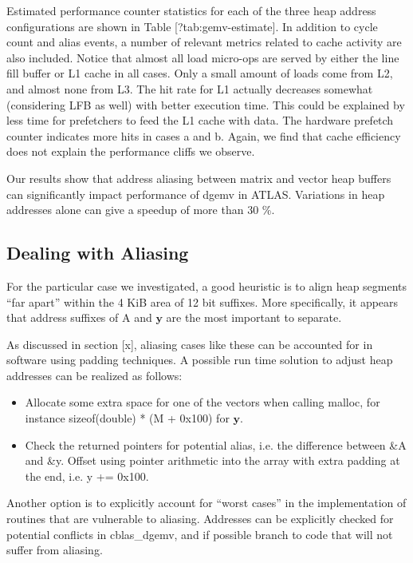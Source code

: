 \documentclass[a4paper,10pt,twocolumn,twoside]{article}
\begin{document}
Estimated performance counter statistics for each of the three heap address configurations are shown in Table [?tab:gemv-estimate].
In addition to cycle count and alias events, a number of relevant metrics related to cache activity are also included.
Notice that almost all load micro-ops are served by either the line fill buffer or L1 cache in all cases.
Only a small amount of loads come from L2, and almost none from L3.
The hit rate for L1 actually decreases somewhat (considering LFB as well) with better execution time.
This could be explained by less time for prefetchers to feed the L1 cache with data.
The hardware prefetch counter indicates more hits in cases a and b.
Again, we find that cache efficiency does not explain the performance cliffs we observe. 

Our results show that address aliasing between matrix and vector heap buffers can significantly impact performance of dgemv in ATLAS.
Variations in heap addresses alone can give a speedup of more than 30 \%.


\subsection{Dealing with Aliasing}
For the particular case we investigated, a good heuristic is to align heap segments “far apart” within the 4 KiB area of 12 bit suffixes.
More specifically, it appears that address suffixes of A and $\boldsymbol{y}$ are the most important to separate.

As discussed in section [x], aliasing cases like these can be accounted for in software using padding techniques.
A possible run time solution to adjust heap addresses can be realized as follows:

\begin{itemize}
  \item Allocate some extra space for one of the vectors when calling malloc, for instance sizeof(double) * (M + 0x100) for $\boldsymbol{y}$.

  \item Check the returned pointers for potential alias, i.e. the difference between \&A and \&y. Offset using pointer arithmetic into the array with extra padding at the end, i.e. y += 0x100. 
\end{itemize}

Another option is to explicitly account for “worst cases” in the implementation of routines that are vulnerable to aliasing.
Addresses can be explicitly checked for potential conflicts in cblas\_dgemv, and if possible branch to code that will not suffer from aliasing. 
\end{document}
